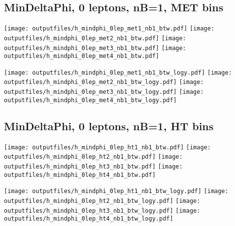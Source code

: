\documentclass[11pt]{article}
\begin{document}
    \clearpage


    \subsection{ MinDeltaPhi, 0 leptons, nB=1, MET bins }

    \noindent
     \texttt{[image: outputfiles/h\_mindphi\_0lep\_met1\_nb1\_btw.pdf]}
     \texttt{[image: outputfiles/h\_mindphi\_0lep\_met2\_nb1\_btw.pdf]}
     \texttt{[image: outputfiles/h\_mindphi\_0lep\_met3\_nb1\_btw.pdf]}
     \texttt{[image: outputfiles/h\_mindphi\_0lep\_met4\_nb1\_btw.pdf]}

    \noindent
     \texttt{[image: outputfiles/h\_mindphi\_0lep\_met1\_nb1\_btw\_logy.pdf]}
     \texttt{[image: outputfiles/h\_mindphi\_0lep\_met2\_nb1\_btw\_logy.pdf]}
     \texttt{[image: outputfiles/h\_mindphi\_0lep\_met3\_nb1\_btw\_logy.pdf]}
     \texttt{[image: outputfiles/h\_mindphi\_0lep\_met4\_nb1\_btw\_logy.pdf]}

    \clearpage



    \subsection{ MinDeltaPhi, 0 leptons, nB=1, HT bins }

    \noindent
     \texttt{[image: outputfiles/h\_mindphi\_0lep\_ht1\_nb1\_btw.pdf]}
     \texttt{[image: outputfiles/h\_mindphi\_0lep\_ht2\_nb1\_btw.pdf]}
     \texttt{[image: outputfiles/h\_mindphi\_0lep\_ht3\_nb1\_btw.pdf]}
     \texttt{[image: outputfiles/h\_mindphi\_0lep\_ht4\_nb1\_btw.pdf]}

    \noindent
     \texttt{[image: outputfiles/h\_mindphi\_0lep\_ht1\_nb1\_btw\_logy.pdf]}
     \texttt{[image: outputfiles/h\_mindphi\_0lep\_ht2\_nb1\_btw\_logy.pdf]}
     \texttt{[image: outputfiles/h\_mindphi\_0lep\_ht3\_nb1\_btw\_logy.pdf]}
     \texttt{[image: outputfiles/h\_mindphi\_0lep\_ht4\_nb1\_btw\_logy.pdf]}

    \clearpage
\end{document}
